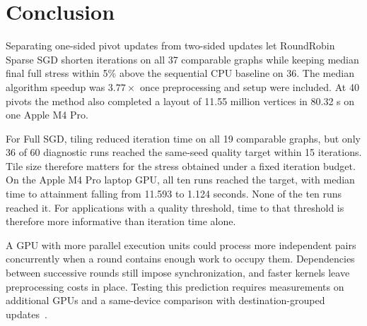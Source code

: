 \section{Conclusion}
\label{sec:conclusion}
Separating one-sided pivot updates from two-sided updates let RoundRobin Sparse SGD shorten iterations on all 37 comparable graphs while keeping median final full stress within 5\% above the sequential CPU baseline on 36. The median algorithm speedup was $3.77\times$ once preprocessing and setup were included. At 40 pivots the method also completed a layout of 11.55 million vertices in 80.32 s on one Apple M4 Pro.

For Full SGD, tiling reduced iteration time on all 19 comparable graphs, but only 36 of 60 diagnostic runs reached the same-seed quality target within 15 iterations. Tile size therefore matters for the stress obtained under a fixed iteration budget. On the Apple M4 Pro laptop GPU, all ten  runs reached the target, with median time to attainment falling from 11.593 to 1.124 seconds. None of the ten  runs reached it. For applications with a quality threshold, time to that threshold is therefore more informative than iteration time alone.

A GPU with more parallel execution units could process more independent pairs concurrently when a round contains enough work to occupy them. Dependencies between successive rounds still impose synchronization, and faster kernels leave preprocessing costs in place. Testing this prediction requires measurements on additional GPUs and a same-device comparison with destination-grouped updates~\cite{ref26}.
